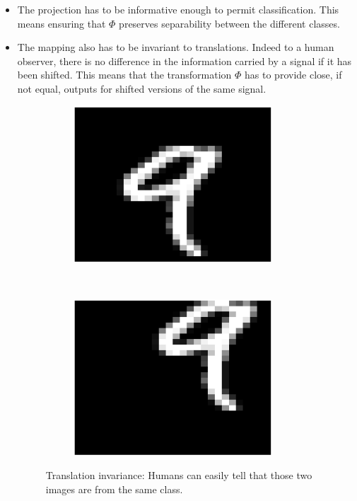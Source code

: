 \documentclass[a4paper,11pt]{report}
\begin{document}
			\begin{itemize}
				\item The projection has to be informative enough to permit classification. This means ensuring that $\Phi$ preserves separability between the different classes.\\

				\item The mapping also has to be invariant to translations. Indeed to a human observer, there is no difference in the information carried by a signal if it has been shifted. This means that the transformation $\Phi$ has to provide close, if not equal, outputs for shifted versions of the same signal.\\
		
				\begin{figure}[h]
					\centering
					\begin{subfigure}[t]{0.48\textwidth}
						\centering
						\includegraphics[height=2.3in]{im_nine_ori.eps}
					\end{subfigure}%
					~ 
					\begin{subfigure}[t]{0.48\textwidth}
						\centering
						\includegraphics[height=2.3in]{im_nine_trl.eps}
					\end{subfigure}
					\caption[Translation invariance.]{\centering Translation invariance: Humans can easily tell that those two images are from the same class.}
					\label{fig:Illustration translation invariance}
				\end{figure}
	

\end{itemize}
\end{document}
